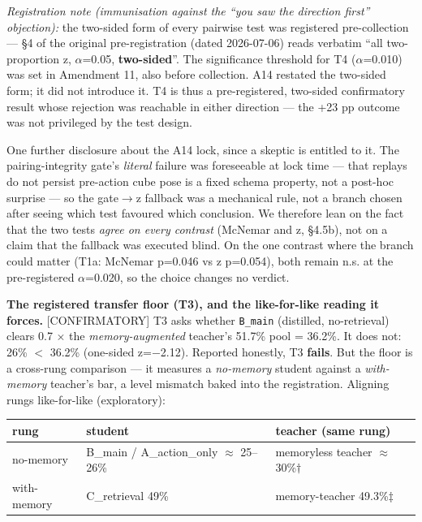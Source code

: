 \emph{Registration note (immunisation against the ``you saw the direction
first'' objection):} the two-sided form of every pairwise test was
registered pre-collection --- \S4 of the original pre-registration (dated
2026-07-06) reads verbatim ``all two-proportion z, $\alpha$=0.05, \textbf{two-sided}''.
The significance threshold for T4 ($\alpha$=0.010) was set in Amendment 11,
also before collection. A14 restated the two-sided form; it did not
introduce it. T4 is thus a pre-registered, two-sided confirmatory
result whose rejection was reachable in either direction --- the +23 pp
outcome was not privileged by the test design.

One further disclosure about the A14 lock, since a skeptic is entitled
to it. The pairing-integrity gate's \emph{literal} failure was foreseeable
at lock time --- that replays do not persist pre-action cube pose is a
fixed schema property, not a post-hoc surprise --- so the gate$\rightarrow$z fallback
was a mechanical rule, not a branch chosen after seeing which test
favoured which conclusion. We therefore lean on the fact that the two
tests \emph{agree on every contrast} (McNemar and z, \S4.5b), not on a claim
that the fallback was executed blind. On the one contrast where the
branch could matter (T1a: McNemar p=0.046 vs z p=0.054), both remain
n.s. at the pre-registered $\alpha$=0.020, so the choice changes no verdict.

\textbf{The registered transfer floor (T3), and the like-for-like reading
it forces.} [CONFIRMATORY] T3 asks whether \texttt{B\_main} (distilled,
no-retrieval) clears 0.7 $\times$ the \emph{memory-augmented} teacher's 51.7\% pool
= 36.2\%. It does not: 26\% $<$ 36.2\% (one-sided z=$-$2.12). Reported
honestly, T3 \textbf{fails}. But the floor is a cross-rung comparison --- it
measures a \emph{no-memory} student against a \emph{with-memory} teacher's bar,
a level mismatch baked into the registration. Aligning rungs
like-for-like (exploratory):

\begin{table}[h]
\centering
\begin{tabular}{l l l}
\toprule
rung & student & teacher (same rung) \\
\midrule
no-memory & B\_main / A\_action\_only $\approx$ 25--26\% & memoryless teacher $\approx$ 30\%$\dagger$ \\
with-memory & C\_retrieval 49\% & memory-teacher 49.3\%$\ddagger$ \\
\bottomrule
\end{tabular}
\end{table}

